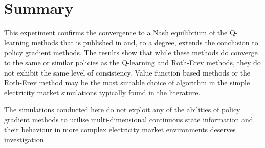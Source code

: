 \section{Summary}
This experiment confirms the convergence to a Nash equilibrium of the
Q-learning methods that is published in  and, to a degree,
extends the conclusion to policy gradient methods.  The results show that
while these methods do converge to the same or similar policies as the
Q-learning and Roth-Erev methods, they do not exhibit the same level of
consistency.  Value function based methods or the Roth-Erev method may be the
most suitable choice of algorithm in the simple electricity market simulations
typically found in the literature.

The simulations conducted here do not exploit any of the abilities of policy
gradient methods to utilise multi-dimensional continuous state information and
their behaviour in more complex electricity market environments deserves
investigation.



